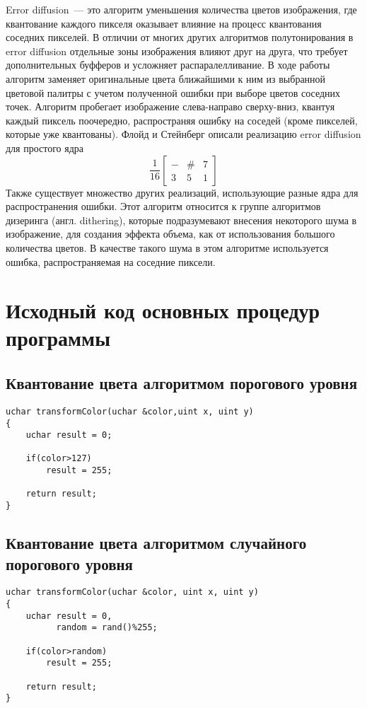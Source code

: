 Error diffusion~--- это алгоритм уменьшения количества цветов изображения, где квантование каждого пикселя оказывает влияние на процесс квантования соседних пикселей. В отличии от многих других алгоритмов полутонирования в error diffusion отдельные зоны изображения влияют друг на друга, что требует дополнительных буфферов и усложняет распаралелливание. В ходе работы алгоритм заменяет оригинальные цвета ближайшими к ним из выбранной цветовой палитры с учетом полученной ошибки при выборе цветов соседних точек. Алгоритм пробегает изображение слева-направо сверху-вниз, квантуя каждый пиксель поочередно, распространяя ошибку на соседей (кроме пикселей, которые уже квантованы).  Флойд и Стейнберг описали реализацию error diffusion для простого ядра
$$
    \frac{1}{16}\left[\begin{array}{ccccc}- & \# & 7 \\ 3 & 5 & 1 \end{array}\right] 
$$
Также существует множество других реализаций, использующие разные ядра для распространения ошибки. Этот алгоритм относится к группе алгоритмов дизеринга (англ. dithering), которые подразумевают внесения некоторого шума в изображение, для создания эффекта объема, как от использования большого количества цветов. В качестве такого шума в этом алгоритме используется ошибка, распространяемая на соседние пиксели.
\newpage
\section{Исходный код основных процедур программы}
\subsection{Квантование цвета алгоритмом порогового уровня}
\begin{lstlisting}
uchar transformColor(uchar &color,uint x, uint y)
{
    uchar result = 0;

    if(color>127)
        result = 255;

    return result;
}
\end{lstlisting}

\subsection{Квантование цвета алгоритмом случайного порогового уровня}
\begin{lstlisting}
uchar transformColor(uchar &color, uint x, uint y)
{
    uchar result = 0,
          random = rand()%255;

    if(color>random)
        result = 255;

    return result;
}
\end{lstlisting}

